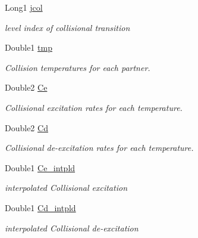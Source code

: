 \begin{DoxyCompactItemize}
\mbox{\label{structCollisionPartner_a62a26634759e5175cb87d436326f9943}} 
Long1 \mbox{\hyperlink{structCollisionPartner_a62a26634759e5175cb87d436326f9943}{jcol}}
\begin{DoxyCompactList}\small\item\em level index of collisional transition \end{DoxyCompactList}\item 
\mbox{\label{structCollisionPartner_ac76e4ed72e87483a3e2419f9d78657cd}} 
Double1 \mbox{\hyperlink{structCollisionPartner_ac76e4ed72e87483a3e2419f9d78657cd}{tmp}}
\begin{DoxyCompactList}\small\item\em Collision temperatures for each partner. \end{DoxyCompactList}\item 
\mbox{\label{structCollisionPartner_a922d82e8e2cd9403af9525dc691c3d1a}} 
Double2 \mbox{\hyperlink{structCollisionPartner_a922d82e8e2cd9403af9525dc691c3d1a}{Ce}}
\begin{DoxyCompactList}\small\item\em Collisional excitation rates for each temperature. \end{DoxyCompactList}\item 
\mbox{\label{structCollisionPartner_a3f31aff11a51516dc53111b33a6b51b9}} 
Double2 \mbox{\hyperlink{structCollisionPartner_a3f31aff11a51516dc53111b33a6b51b9}{Cd}}
\begin{DoxyCompactList}\small\item\em Collisional de-\/excitation rates for each temperature. \end{DoxyCompactList}\item 
\mbox{\label{structCollisionPartner_a0a1ea826843b3c39e3467b459fe1dacb}} 
Double1 \mbox{\hyperlink{structCollisionPartner_a0a1ea826843b3c39e3467b459fe1dacb}{Ce\+\_\+intpld}}
\begin{DoxyCompactList}\small\item\em interpolated Collisional excitation \end{DoxyCompactList}\item 
\mbox{\label{structCollisionPartner_adc0792b4da41beb3581d55c219b9b090}} 
Double1 \mbox{\hyperlink{structCollisionPartner_adc0792b4da41beb3581d55c219b9b090}{Cd\+\_\+intpld}}
\begin{DoxyCompactList}\small\item\em interpolated Collisional de-\/excitation \end{DoxyCompactList}\end{DoxyCompactItemize}


